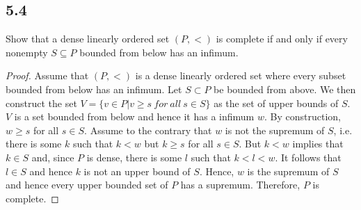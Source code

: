 \subsection*{5.4} Show that a dense linearly ordered set $(P, <)$ is complete if and only if every nonempty $S \subseteq P$ bounded from below has an infimum.

\begin{proof}
Assume that $(P, <)$ is a dense linearly ordered set where every subset bounded from below has an infimum. Let $S \subset P$ be bounded from above. We then construct the set $V = \{v \in P | v \geq s ~ for ~all ~s \in S\}$ as the set of upper bounds of $S$. $V$ is a set bounded from below and hence it has a infimum $w$. By construction, $w \geq s$ for all $s \in S$. Assume to the contrary that $w$ is not the supremum of $S$, i.e. there is some $k$ such that $k < w$ but $k \geq s$ for all $s \in S$. But $k < w$ implies that $k \in S$ and, since $P$ is dense, there is some $l$ such that $k < l < w$. It follows that $l \in S$ and hence $k$ is not an upper bound of $S$. Hence, $w$ is the supremum of $S$ and hence every upper bounded set of $P$ has a supremum. Therefore, $P$ is complete.
\end{proof}


